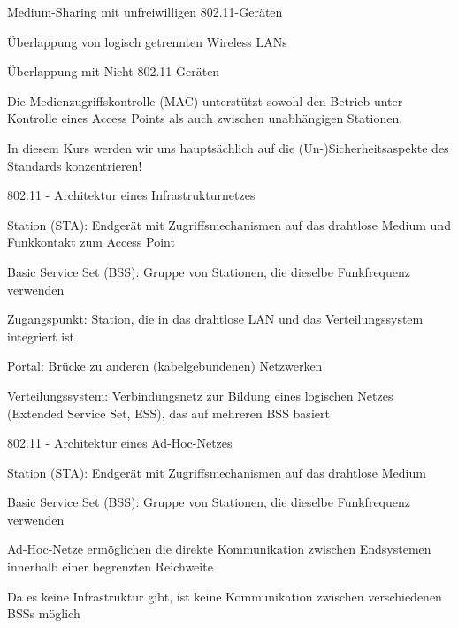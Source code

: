 \documentclass[a4paper]{article}
\begin{document}
\begin{multicols}{3}
\begin{itemize*}
            \begin{itemize*}
                  \item Medium-Sharing mit unfreiwilligen 802.11-Geräten
                  \item Überlappung von logisch getrennten Wireless LANs
                  \item Überlappung mit Nicht-802.11-Geräten
            \end{itemize*}
            \item
            Die Medienzugriffskontrolle (MAC) unterstützt sowohl den Betrieb unter
            Kontrolle eines Access Points als auch zwischen unabhängigen
            Stationen.
            \item
            In diesem Kurs werden wir uns hauptsächlich auf die
            (Un-)Sicherheitsaspekte des Standards konzentrieren!
      \end{itemize*}

      802.11 - Architektur eines Infrastrukturnetzes

      \begin{itemize*}
            \item
            Station (STA): Endgerät mit Zugriffsmechanismen auf das drahtlose
            Medium und Funkkontakt zum Access Point
            \item
            Basic Service Set (BSS): Gruppe von Stationen, die dieselbe
            Funkfrequenz verwenden
            \item
            Zugangspunkt: Station, die in das drahtlose LAN und das
            Verteilungssystem integriert ist
            \item
            Portal: Brücke zu anderen (kabelgebundenen) Netzwerken
            \item
            Verteilungssystem: Verbindungsnetz zur Bildung eines logischen Netzes
            (Extended Service Set, ESS), das auf mehreren BSS basiert
      \end{itemize*}

      802.11 - Architektur eines Ad-Hoc-Netzes

      \begin{itemize*}
            \item
            Station (STA): Endgerät mit Zugriffsmechanismen auf das drahtlose
            Medium
            \item
            Basic Service Set (BSS): Gruppe von Stationen, die dieselbe
            Funkfrequenz verwenden
            \item
            Ad-Hoc-Netze ermöglichen die direkte Kommunikation zwischen
            Endsystemen innerhalb einer begrenzten Reichweite
            \item
            Da es keine Infrastruktur gibt, ist keine Kommunikation zwischen
            verschiedenen BSSs möglich
      \end{itemize*}


\end{multicols}
\end{document}
